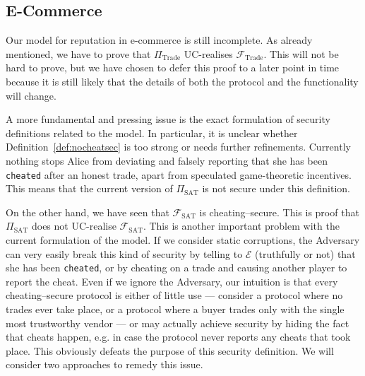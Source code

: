 \subsection{E-Commerce}
  Our model for reputation in e-commerce is still incomplete. As already mentioned, we
  have to prove that $\Pi_{\mathrm{Trade}}$ UC-realises $\mathcal{F}_{\mathrm{Trade}}$.
  This will not be hard to prove, but we have chosen to defer this proof to a later point
  in time because it is still likely that the details of both the protocol and the
  functionality will change.

  A more fundamental and pressing issue is the exact formulation of security definitions
  related to the model. In particular, it is unclear whether
  Definition~\ref{def:nocheatsec} is too strong or needs further refinements. Currently
  nothing stops Alice from deviating and falsely reporting that she has been
  \texttt{cheated} after an honest trade, apart from speculated game-theoretic incentives.
  This means that the current version of $\Pi_{\mathrm{SAT}}$ is not secure under this
  definition.

  On the other hand, we have seen that $\mathcal{F}_{\mathrm{SAT}}$ is cheating--secure.
  This is proof that $\Pi_{\mathrm{SAT}}$ does not UC-realise
  $\mathcal{F}_{\mathrm{SAT}}$. This is another important problem with the current
  formulation of the model. If we consider static corruptions, the Adversary can very
  easily break this kind of security by telling to $\mathcal{E}$ (truthfully or not) that
  she has been \texttt{cheated}, or by cheating on a trade and causing another player to
  report the cheat. Even if we ignore the Adversary, our intuition is that every
  cheating--secure protocol is either of little use --- consider a protocol where no
  trades ever take place, or a protocol where a buyer trades only with the single most
  trustworthy vendor --- or may actually achieve security by hiding the fact that cheats
  happen, e.g. in case the protocol never reports any cheats that took place. This
  obviously defeats the purpose of this security definition. We will consider two
  approaches to remedy this issue.
